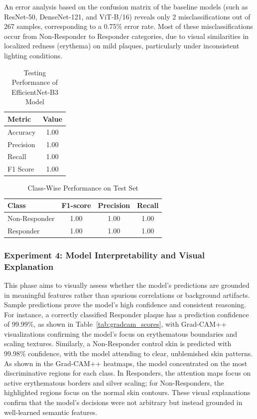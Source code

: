 \documentclass[11pt,journal,compsoc]{IEEEtran}
\begin{document}
An error analysis based on the confusion matrix of the baseline models (such as ResNet-50, DenseNet-121, and ViT-B/16) reveals only 2 misclassifications out of 267 samples, corresponding to a 0.75\% error rate. Most of these misclassifications occur from Non-Responder to Responder categories, due to visual similarities in localized redness (erythema) on mild plaques, particularly under inconsistent lighting conditions.

\begin{table}[h]
\centering
\caption{Testing Performance of EfficientNet-B3 Model}
\label{tab:test_metrics}
\begin{tabular}{lc}
\toprule
Metric & Value \\
\midrule
Accuracy & 1.00 \\
Precision & 1.00 \\
Recall & 1.00 \\
F1 Score & 1.00 \\
\bottomrule
\end{tabular}
\end{table}

\begin{table}[h]
\centering
\caption{Class-Wise Performance on Test Set}
\label{tab:class_wise}
\begin{tabular}{lccc}
\toprule
Class & F1-score & Precision & Recall \\
\midrule
Non-Responder & 1.00 & 1.00 & 1.00 \\
Responder & 1.00 & 1.00 & 1.00 \\
\bottomrule
\end{tabular}
\end{table}

\subsubsection{Experiment 4: Model Interpretability and Visual Explanation}
This phase aims to visually assess whether the model’s predictions are grounded in meaningful features rather than spurious correlations or background artifacts. Sample predictions prove the model’s high confidence and consistent reasoning. For instance, a correctly classified Responder plaque has a prediction confidence of 99.99\%, as shown in Table~\ref{tab:gradcam_scores}, with Grad-CAM++ visualizations confirming the model’s focus on erythematous boundaries and scaling textures. Similarly, a Non-Responder control skin is predicted with 99.98\% confidence, with the model attending to clear, unblemished skin patterns. As shown in the Grad-CAM++ heatmaps, the model concentrated on the most discriminative regions for each class. In Responders, the attention maps focus on active erythematous borders and silver scaling; for Non-Responders, the highlighted regions focus on the normal skin contours. These visual explanations confirm that the model's decisions were not arbitrary but instead grounded in well-learned semantic features.
\end{document}
